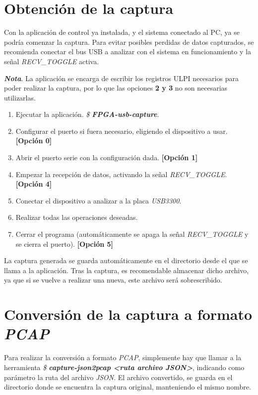 \section{Obtención de la captura}
Con la aplicación de control ya instalada, y el sistema conectado al PC, ya se podría comenzar la captura.
Para evitar posibles perdidas de datos capturados, se recomienda conectar el bus USB a analizar con el sistema en funcionamiento y la señal \emph{RECV\_TOGGLE} activa.

\emph{\textbf{Nota}}. La aplicación se encarga de escribir los registros ULPI necesarios para poder realizar la captura, por lo que las opciones \textbf{2 y 3} no son necesarias utilizarlas.

\begin{enumerate}
    \item Ejecutar la aplicación. \emph{\$ \textbf{FPGA-usb-capture}}.
    \item Configurar el puerto si fuera necesario, eligiendo el dispositivo a usar. \textbf{[Opción 0]}
    \item Abrir el puerto serie con la configuración dada. \textbf{[Opción 1]}
    \item Empezar la recepción de datos, activando la señal \emph{RECV\_TOGGLE}. \textbf{[Opción 4]}
    \item Conectar el dispositivo a analizar a la placa \emph{USB3300}.
    \item Realizar todas las operaciones deseadas.
    \item Cerrar el programa (automáticamente se apaga la señal \emph{RECV\_TOGGLE} y se cierra el puerto). \textbf{[Opción 5]}
\end{enumerate}

La captura generada se guarda automáticamente en el directorio desde el que se llama a la aplicación. Tras la captura, es recomendable almacenar dicho archivo, ya que si se vuelve a realizar una nueva, este archivo será sobrescribido.

\section{Conversión de la captura a formato \emph{PCAP}}
Para realizar la conversión a formato \emph{PCAP}, simplemente hay que llamar a la herramienta \emph{\$ \textbf{capture-json2pcap <ruta archivo JSON>}}, indicando como parámetro la ruta del archivo \emph{JSON}. El archivo convertido, se guarda en el directorio donde se encuentra la captura original, manteniendo el mismo nombre.